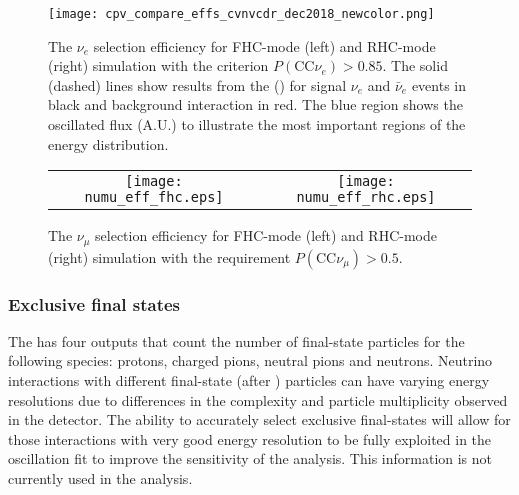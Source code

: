 \begin{figure}
    \centering
		\texttt{[image: cpv\_compare\_effs\_cvnvcdr\_dec2018\_newcolor.png]} %
	\caption{The $\nu_e$ selection efficiency for FHC-mode (left) and RHC-mode (right) simulation with the criterion $P(\textrm{CC}\nu_e) > 0.85$. The solid (dashed) lines show results from the  () for signal $\nu_e$ and $\bar{\nu}_e$ events in black and  background interaction in red. The blue region shows the oscillated flux (A.U.) to illustrate the most important regions of the energy distribution.}
    \label{fig:nueeff}
\end{figure}

\begin{figure}
    \centering
    \begin{tabular}{cc}
		\texttt{[image: numu\_eff\_fhc.eps]} &
		\texttt{[image: numu\_eff\_rhc.eps]} 
	\end{tabular}
	\caption{The $\nu_\mu$ selection efficiency for FHC-mode (left) and RHC-mode (right) simulation with the requirement $P(\textrm{CC}\nu_\mu) > 0.5$.}
    \label{fig:numueff}
\end{figure}

\subsubsection{Exclusive final states}
The  has four outputs that count the number of final-state particles for the following species: protons, charged pions, neutral pions and neutrons. Neutrino interactions with different final-state (after ) particles can have varying energy resolutions due to differences in the complexity and particle multiplicity observed in the detector. The ability to accurately select exclusive final-states will allow for those interactions with very good energy resolution to be fully exploited in the oscillation fit to improve the sensitivity of the analysis. This information is not currently used in the analysis.

